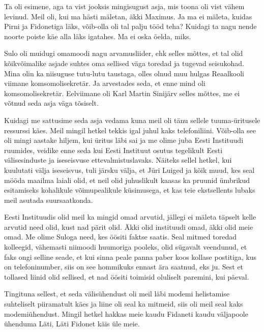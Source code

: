 
Ta oli esimene, aga ta vist jooksis mingisugust asja, mis toona oli vist vähem levinud. Meil oli, kui ma hästi mäletan, äkki  Maximus. Ja ma ei mäleta, kuidas Pirni ja Fidonetiga läks, võib-olla oli tal palju tööd teha? Kuidagi ta nagu nende noorte poiste käe alla läks igatahes. Ma ei oska öelda, miks.

Sulo oli muidugi omamoodi nagu arvamusliider, ehk selles mõttes, et tal olid  kõikvõimalike asjade suhtes oma sellised väga toredad ja  tugevad seisukohad. Mina olin ka niisuguse tutu-lutu taustaga, olles olnud muu hulgas Reaalkooli viimane komsomolisekretär.
Ja arvestades seda, et enne mind oli komsomolisekretär. Eelviimane oli Karl Martin Sinijärv selles mõttes, me  ei võtnud seda asja väga tõsiselt.

Kuidagi me sattusime seda asja vedama  kuna meil oli tänu sellele tuuma-üritusele ressurssi käes. Meil mingil hetkel tekkis igal juhul  kaks telefoniliini. Võib-olla see oli mingi aastake hiljem, kui  üritus läbi sai ja me olime juba Eesti Instituudi ruumides, veidike enne seda kui Eesti Instituut osutus tegelikult Eesti välisesinduste ja iseseisvuse ettevalmistuslavaks. Näiteks sellel hetkel, kui kuulutati välja iseseisvus, tuli järsku välja, et Jüri Luiged ja kõik muud, kes seal mööda maailma laiali olid, et neil olid juhuslikult kaasas ka pruunid ümbrikud esitamiseks kohalikule võimupealikule küsimusega, et kas teie ekstsellents lubaks meil asutada suursaatkonda. 

Eesti Instituudis olid meil ka mingid omad arvutid, jällegi ei mäleta täpselt kelle arvutid need olid, kust nad pärit olid. Äkki olid instituudi omad, äkki olid meie omad. Me olime Suloga need, kes öösiti  faktse saatis. Seal mitmed toredad kolleegid, vähemasti niimoodi huumoriga pooleks, olid sügavalt veendunud, et faks ongi selline  seade, et kui sinna  peale panna paber koos kollase postitiga, kus on telefoninumber, siis on see hommikuks ennast ära saatnud, eks ju. Sest et tollased liinid olid sellised, et nad öösiti toimisid oluliselt paremini, kui päeval. 

Tingituna sellest, et seda välisühendust oli meil läbi modemi helistamise  suhteliselt piiramatult käes ja liine oli seal ka mitmeid, siis oli meil seal kaks modemiühendust. Mingil hetkel hakkas meie kaudu Fidaneti kaudu väljapoole ühenduma Läti, Läti Fidonet käis üle meie.

